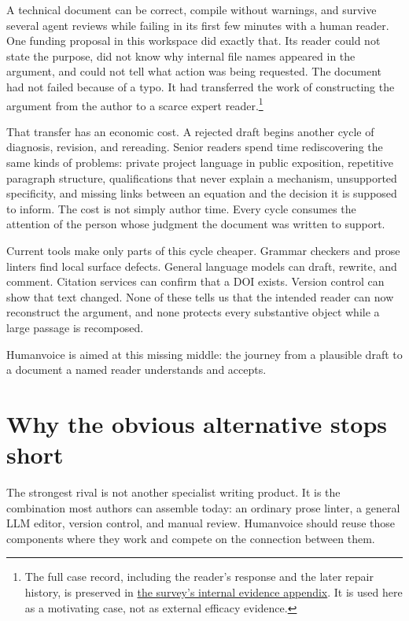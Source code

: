 \documentclass[
  11pt,
  english,
]{article}
\begin{document}
A technical document can be correct, compile without warnings, and
survive several agent reviews while failing in its first few minutes
with a human reader. One funding proposal in this workspace did exactly
that. Its reader could not state the purpose, did not know why internal
file names appeared in the argument, and could not tell what action was
being requested. The document had not failed because of a typo. It had
transferred the work of constructing the argument from the author to a
scarce expert reader.\footnote{The full case record, including the
  reader's response and the later repair history, is preserved in
  \href{part1_failures.tex}{the survey's internal evidence appendix}. It
  is used here as a motivating case, not as external efficacy evidence.}

That transfer has an economic cost. A rejected draft begins another
cycle of diagnosis, revision, and rereading. Senior readers spend time
rediscovering the same kinds of problems: private project language in
public exposition, repetitive paragraph structure, qualifications that
never explain a mechanism, unsupported specificity, and missing links
between an equation and the decision it is supposed to inform. The cost
is not simply author time. Every cycle consumes the attention of the
person whose judgment the document was written to support.

Current tools make only parts of this cycle cheaper. Grammar checkers
and prose linters find local surface defects. General language models
can draft, rewrite, and comment. Citation services can confirm that a
DOI exists. Version control can show that text changed. None of these
tells us that the intended reader can now reconstruct the argument, and
none protects every substantive object while a large passage is
recomposed.

Humanvoice is aimed at this missing middle: the journey from a plausible
draft to a document a named reader understands and accepts.

\hypertarget{why-the-obvious-alternative-stops-short}{%
\section{Why the obvious alternative stops
short}\label{why-the-obvious-alternative-stops-short}}

The strongest rival is not another specialist writing product. It is the
combination most authors can assemble today: an ordinary prose linter, a
general LLM editor, version control, and manual review. Humanvoice
should reuse those components where they work and compete on the
connection between them.
\end{document}
